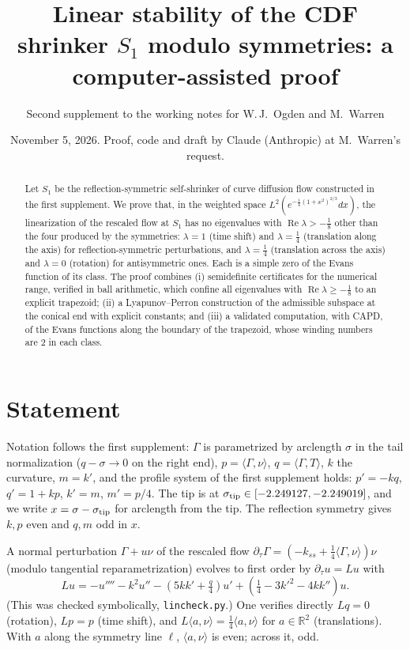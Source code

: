 \documentclass[11pt]{amsart}
\title{Linear stability of the CDF shrinker $S_1$ modulo symmetries: a computer-assisted proof}
\author{Second supplement to the working notes for W.\,J.~Ogden and M.~Warren}
\date{November 5, 2026. Proof, code and draft by Claude (Anthropic) at M.~Warren's request.}
\theoremstyle{remark}
\newcommand{\R}{\mathbb{R}}
\newcommand{\ip}[2]{\langle #1,#2\rangle}
\newcommand{\re}{\operatorname{Re}}
\begin{document}
\maketitle

\begin{abstract}
Let $S_1$ be the reflection-symmetric self-shrinker of curve diffusion flow constructed in the first supplement. We prove that, in the weighted space $L^2(e^{-\frac14(1+x^2)^{2/3}}dx)$, the linearization of the rescaled flow at $S_1$ has no eigenvalues with $\re\lambda>-\frac18$ other than the four produced by the symmetries: $\lambda=1$ (time shift) and $\lambda=\frac14$ (translation along the axis) for reflection-symmetric perturbations, and $\lambda=\frac14$ (translation across the axis) and $\lambda=0$ (rotation) for antisymmetric ones. Each is a simple zero of the Evans function of its class. The proof combines (i) semidefinite certificates for the numerical range, verified in ball arithmetic, which confine all eigenvalues with $\re\lambda\ge-\frac18$ to an explicit trapezoid; (ii) a Lyapunov--Perron construction of the admissible subspace at the conical end with explicit constants; and (iii) a validated computation, with CAPD, of the Evans functions along the boundary of the trapezoid, whose winding numbers are $2$ in each class.
\end{abstract}

\section{Statement}
Notation follows the first supplement: $\Gamma$ is parametrized by arclength $\sigma$ in the tail normalization ($q-\sigma\to0$ on the right end), $p=\ip{\Gamma}{\nu}$, $q=\ip{\Gamma}{T}$, $k$ the curvature, $m=k'$, and the profile system of the first supplement holds: $p'=-kq$, $q'=1+kp$, $k'=m$, $m'=p/4$. The tip is at $\sigma_{\rm tip}\in[-2.249127,-2.249019]$, and we write $x=\sigma-\sigma_{\rm tip}$ for arclength from the tip. The reflection symmetry gives $k,p$ even and $q,m$ odd in $x$.

A normal perturbation $\Gamma+u\nu$ of the rescaled flow $\partial_\tau\Gamma=(-k_{ss}+\frac14\ip{\Gamma}{\nu})\nu$ (modulo tangential reparametrization) evolves to first order by $\partial_\tau u=Lu$ with
\[
Lu=-u''''-k^2u''-(5kk'+\tfrac q4)u'+(\tfrac14-3k'^2-4kk'')u .
\]
(This was checked symbolically, \texttt{lincheck.py}.) One verifies directly $Lq=0$ (rotation), $Lp=p$ (time shift), and $L\ip{a}{\nu}=\frac14\ip{a}{\nu}$ for $a\in\R^2$ (translations). With $a$ along the symmetry line $\ell$, $\ip{a}{\nu}$ is even; across it, odd.
\end{document}
